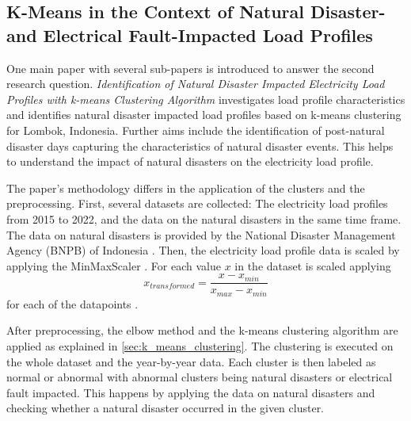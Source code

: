 \subsection{K-Means in the Context of Natural Disaster- and Electrical Fault-Impacted Load Profiles}
One main paper with several sub-papers is introduced to answer the second research question.
\textit{Identification of Natural Disaster Impacted Electricity Load Profiles with k-means Clustering Algorithm} \cite{JES-IND} investigates load profile characteristics and identifies natural disaster impacted load profiles based on k-means clustering for Lombok, Indonesia.
Further aims include the identification of post-natural disaster days capturing the characteristics of natural disaster events.
This helps to understand the impact of natural disasters on the electricity load profile.

The paper's methodology differs in the application of the clusters and the preprocessing.
First, several datasets are collected: The electricity load profiles from 2015 to 2022, and the data on the natural disasters in the same time frame.
The data on natural disasters is provided by the National Disaster Management Agency (BNPB) of Indonesia \cite{BNP-CAD}.
Then, the electricity load profile data is scaled by applying the MinMaxScaler \cite{SKL-MMS}.
For each value $x$ in the dataset is scaled applying \begin{equation}\label{eq:minmaxscaler} 
      x_{transformed} = \frac{x - x_{min}}{x_{max} - x_{min}}
\end{equation} for each of the datapoints \cite{JOJ-ENP}.

After preprocessing, the elbow method and the k-means clustering algorithm are applied as explained in \autoref*{sec:k_means_clustering}.
The clustering is executed on the whole dataset and the year-by-year data.
Each cluster is then labeled as normal or abnormal with abnormal clusters being natural disasters or electrical fault impacted.
This happens by applying the data on natural disasters and checking whether a natural disaster occurred in the given cluster.



